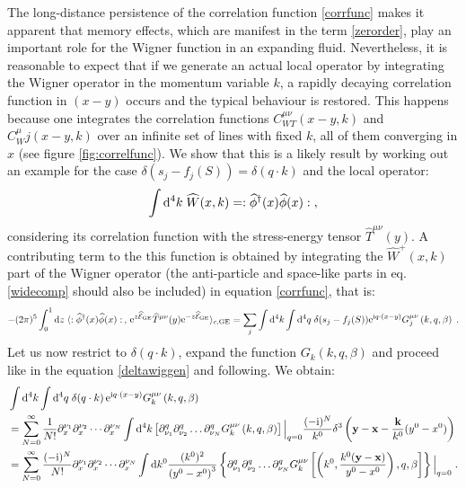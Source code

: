 \documentclass[prd,superscriptaddress,nofootinbib,notitlepage]{revtex4-1}
\def\wT{{\widehat T}}
\def\wE{{\widehat{\cal E}}}
\def\wW{\widehat W}
\def\wphi{\widehat \phi}
\newcommand{\e}{{\rm e}}
\newcommand{\di}{{\rm d}}
\newcommand{\ii}{{\rm i}}
\newcommand{\kb}{{\mathbf{k}}}
\newcommand{\x}{{\mathbf{x}}}
\newcommand{\y}{{\mathbf{y}}}
\begin{document}
The long-distance persistence of the correlation function \eqref{corrfunc} makes it apparent that memory effects, which 
are manifest in the term \eqref{zerorder}, play an important role for the Wigner function in an expanding fluid. 
Nevertheless, it is reasonable to expect that if we generate an actual local operator by integrating the Wigner operator 
in the momentum variable $k$, a rapidly decaying correlation function in $(x-y)$ occurs and the typical behaviour is restored.
This happens because one integrates the correlation functions $C^{\mu\nu}_{WT}(x-y,k)$ and $C^\mu_Wj(x-y,k)$ over an 
infinite set of lines with fixed $k$, all of them converging in $x$ (see figure \ref{fig:correlfunc}). We show that this is a 
likely result by working out an example for the case $\delta(s_j - f_j(S))=\delta(q\cdot k)$ and the local operator:
%
$$
 \int \di^4 k \; \wW(x,k) = : \wphi^\dagger(x) \wphi(x) :\;,
$$
%
considering its correlation function with the stress-energy tensor $\wT^{\mu\nu}(y)$. A contributing term to the
this function is obtained by integrating the $\wW^+(x,k)$ part of the Wigner operator (the anti-particle and
space-like parts in eq. \eqref{widecomp} should also be included) in equation \eqref{corrfunc}, that is:
%
$$
-(2\pi)^5 \int^1_0\di z \; \langle : \wphi^\dagger(x) \wphi(x) :\,,\,\e^{z\wE_{\rm GE}}\wT^{\mu\nu}(y)\e^{-z\wE_{\rm GE}}
\rangle_{c,\mathrm{GE}} = \sum_{j} \int \di^4 k \int \di^{4}q\; \delta(s_j - f_j(S)) \e^{\ii q\cdot (x-y)} 
G_{j}^{\mu\nu}\left(k,q,\beta\right) \;.
$$
%
Let us now restrict to $\delta(q \cdot k)$, expand the function $G_k\left(k,q,\beta\right)$ and proceed like in the 
equation \eqref{deltawiggen} and following. We obtain:
%
\begin{align*}
& \int \di^4 k \int \di^{4}q\; \delta(q \cdot k) \, \e^{\ii q\cdot (x-y)} G_k^{\mu\nu}\left(k,q,\beta\right)
    \nonumber \\
& = \sum_{N=0}^{\infty}\frac{1}{N!} \partial_x^{\nu_1}\partial_x^{\nu_2}\cdots \partial_x^{\nu_N} 
    \int \di^4 k \left[\partial_{\nu_{1}}^{q}\partial_{\nu_{2}}^{q} \ldots\partial_{\nu_{N}}^{q} 
    G_k^{\mu\nu}\left(k,q,\beta\right)\right]\Big|_{q=0} \frac{(-\ii)^N}{k^0} \delta^3\left(\y-\x - \frac{\kb}{k^0} (y^0-x^0) \right)\nonumber \\
& = \sum_{N=0}^{\infty}\frac{(-\ii)^N}{N!} \partial_x^{\nu_1}\partial_x^{\nu_2}\cdots \partial_x^{\nu_N} 
    \int \di k^0 \frac{(k^0)^2}{\left(y^0-x^0\right)^3}\left\{\partial_{\nu_{1}}^{q}\partial_{\nu_{2}}^{q} \ldots\partial_{\nu_{N}}^{q} 
    G_k^{\mu\nu}\left[\left(k^0,\frac{k^0(\y -\x)}{y^0-x^0}\right),q,\beta\right]\right\}\Big|_{q=0}\;. 
\end{align*}
\end{document}
